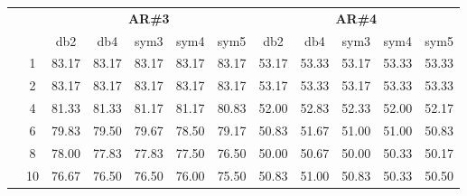 \begin{table}[H]
\begin{tabular}{|c|c|c c c c c|c c c c c|}
\cline{3-12}
\multicolumn{2}{c}{} & \multicolumn{5}{|c|}{\textbf{AR\#3}}  & \multicolumn{5}{c|}{\textbf{AR\#4}} \\\cline{3-12}
\multicolumn{2}{c}{}  & \multicolumn{1}{|c}{db2} & db4 & sym3 & sym4 & sym5 & db2 & db4& sym3 & sym4 & sym5 \\\hline
\multicolumn{1}{|c|}{ \multirow{6}{*}{\rotatebox[origin=c]{90}{\textbf{K-vizinhos}}} }
&1&83.17	&83.17	&83.17	&83.17	&83.17	&53.17	&53.33	&53.17	&53.33	&53.33\\\cline{2-12}
&2&83.17	&83.17	&83.17	&83.17	&83.17	&53.17	&53.33	&53.17	&53.33	&53.33\\\cline{2-12}
&4&81.33	&81.33	&81.17	&81.17	&80.83	&52.00	&52.83	&52.33	&52.00	&52.17\\\cline{2-12}
&6&79.83	&79.50	&79.67	&78.50	&79.17	&50.83	&51.67	&51.00	&51.00	&50.83\\\cline{2-12}
&8&78.00	&77.83	&77.83	&77.50	&76.50	&50.00	&50.67	&50.00	&50.33	&50.17\\\cline{2-12}
&10&76.67	&76.50	&76.50	&76.00	&75.50	&50.83	&51.00	&50.83	&50.33	&50.50%

	
\\\midrule
\end{tabular}
\end{table}






